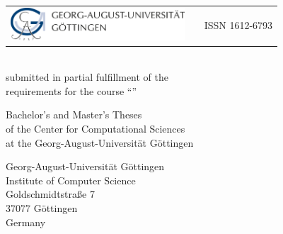%
%

\begin{titlepage}
    \normalsize
    \begin{tabularx}{\textwidth}{lXr}
        \multirow{2}{*}{\includegraphics[width=6.5cm]{images/goe-logo.jpg}} 
        & & ISSN 1612-6793\\
    \end{tabularx}

    \large
    \centering

    \vspace{3cm}

    \textbf{\LARGE \mytype}\\

    submitted in partial fulfillment of the\\
    requirements for the course ``\mycourse''

    \vspace{2cm}

    \textbf{\LARGE \mytitle}

    \vspace{2cm}

    \myauthor

    \vspace{2cm}

    \mydepartment

    \vspace{2cm}

    Bachelor's and Master's Theses\\
    of the Center for Computational Sciences\\
    at the Georg-August-Universität Göttingen

    \vspace{0.2cm}

    \mysubmissiondate


    \clearpage
    \thispagestyle{empty}
    \null
    \flushleft
    \onehalfspacing
    \normalsize

    \vspace{12cm}

    Georg-August-Universität Göttingen\\
    Institute of Computer Science\\[3ex]
    Goldschmidtstraße 7\\
    37077 Göttingen\\
    Germany\\[3ex]


\end{titlepage}
